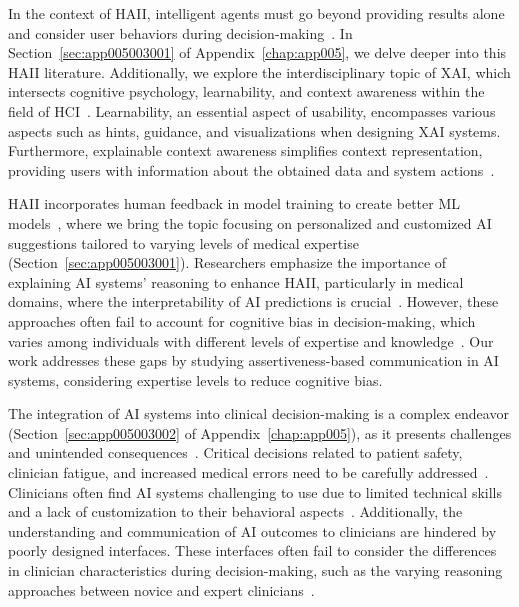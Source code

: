 In the context of \ac{HAII}, intelligent agents must go beyond providing results alone and consider user behaviors during decision-making~\cite{10.1145/3313831.3376807}.
In Section~\ref{sec:app005003001} of Appendix~\ref{chap:app005}, we delve deeper into this \ac{HAII} literature.
Additionally, we explore the interdisciplinary topic of \ac{XAI}, which intersects cognitive psychology, learnability, and context awareness within the field of \ac{HCI}~\cite{doi:10.1073/pnas.1618211113, doi:10.1080/07370024.2021.1977128}.
Learnability, an essential aspect of usability, encompasses various aspects such as hints, guidance, and visualizations when designing \ac{XAI} systems\cite{10.1145/1753326.1753552, 10.1145/3173574.3174156}.
Furthermore, explainable context awareness simplifies context representation, providing users with information about the obtained data and system actions~\cite{10.1145/3313831.3376545, 10.1145/1518701.1518832}.

\ac{HAII} incorporates human feedback in model training to create better \ac{ML} models~\cite{10.1145/3290605.3300233, 10.1145/3132272.3134111, Kocielnik:2019:YAI:3290605.3300641, aha2017ai}, where we bring the topic focusing on personalized and customized \ac{AI} suggestions tailored to varying levels of medical expertise (Section~\ref{sec:app005003001}).
Researchers emphasize the importance of explaining \ac{AI} systems' reasoning to enhance \ac{HAII}, particularly in medical domains, where the interpretability of \ac{AI} predictions is crucial~\cite{10.1145/3411764.3445717, Rudin2022, Kawamleh2022, Lundberg2018}.
However, these approaches often fail to account for cognitive bias in decision-making, which varies among individuals with different levels of expertise and knowledge~\cite{https://doi.org/10.1111/nuf.12430, Seidel2021}.
Our work addresses these gaps by studying assertiveness-based communication in \ac{AI} systems, considering expertise levels to reduce cognitive bias.

The integration of \ac{AI} systems into clinical decision-making is a complex endeavor (Section~\ref{sec:app005003002} of Appendix~\ref{chap:app005}), as it presents challenges and unintended consequences~\cite{burr2018analysis, miller2019intrinsically}.
Critical decisions related to patient safety, clinician fatigue, and increased medical errors need to be carefully addressed~\cite{10.1093/jamia/ocab291, 10.1117/12.2613082, doi:10.1148/radiol.212631}.
Clinicians often find \ac{AI} systems challenging to use due to limited technical skills and a lack of customization to their behavioral aspects~\cite{CALISTO2022102922}.
Additionally, the understanding and communication of \ac{AI} outcomes to clinicians are hindered by poorly designed interfaces.
These interfaces often fail to consider the differences in clinician characteristics during decision-making, such as the varying reasoning approaches between novice and expert clinicians~\cite{Edgar2022}.

